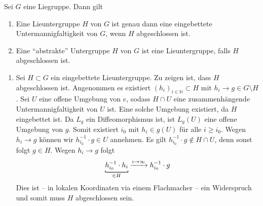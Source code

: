 \begin{satz}[label=satz:1210]
	Sei $G$ eine Liegruppe. Dann gilt
	\begin{enumerate}[1)]
		\item Eine Lieuntergruppe $H$ von $G$ ist genau dann eine eingebettete Untermannigfaltigkeit von $G$, wenn $H$ abgeschlossen ist.
		\item Eine \enquote{abstrakte} Untergruppe $H$ von $G$ ist eine Lieuntergruppe, falls $H$ abgeschlossen ist.
	\end{enumerate}
\end{satz}
\begin{beweis}
	\begin{enumerate}[1)]
		\item Sei $H \subset G$ ein eingebettete Lieuntergruppe. 
		Zu zeigen ist, dass $H$ abgeschlossen ist.
		Angenommen es existiert $(h_i)_{i \in \mathbb{N}} \subset H$ mit $h_i \to g \in G \setminus H$.
		Sei $U$ eine offene Umgebung von $e$, sodass $H \cap U$ eine zusammenhängende Untermannigfaltigkeit von $U$ ist.
		Eine solche Umgebung existiert, da $H$ eingebettet ist.
		Da $L_g$ ein Diffeomorphismus ist, ist $L_g(U)$ eine offene Umgebung von $g$.
		Somit existiert $i_0$ mit $h_i \in g(U)$ für alle $i \ge i_0$.
		Wegen $h_i \to g$ können wir $h_{i_0}^{-1} \cdot g \in U$ annehmen.
		Es gilt $h_{i_0}^{-1} \cdot g \notin H \cap U$, denn sonst folgt $g \in H$.
		Wegen $h_i \to g$ folgt
		\[
			\Underbracket{h_{i_0}^{-1}\cdot h_i}{\in H}  \xrightarrow{i \to \infty} h_{i_0}^{-1} \cdot g
		\]
		Dies ist -- in lokalen Koordinaten via einem Flachmacher -- ein Widerspruch und somit muss $H$ abgeschlossen sein.
		

\end{enumerate}
\end{beweis}
